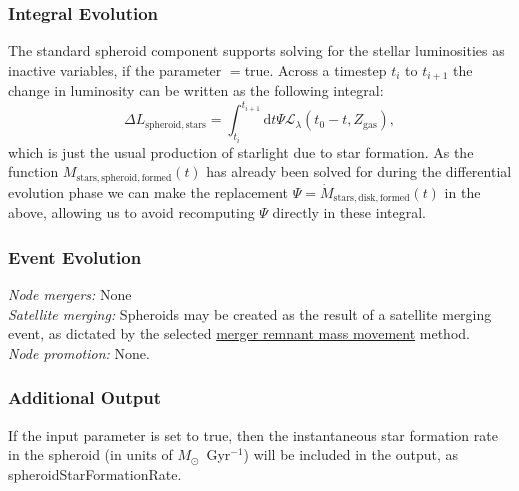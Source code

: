 \subsubsection{Integral Evolution}

The standard spheroid component supports solving for the stellar luminosities as inactive variables, if the parameter {\normalfont \ttfamily [spheroidLuminositiesStellarInactive]}$=${\normalfont \ttfamily true}. Across a timestep $t_i$ to $t_{i+1}$ the change in luminosity can be written as the following integral:
\begin{equation}
\Delta L_\mathrm{spheroid, stars} = \int_{t_{i}}^{t_{i+1}} \mathrm{d}t \Psi \mathcal{L}_\lambda(t_0-t,Z_\mathrm{gas}),
\end{equation}
which is just the usual production of starlight due to star formation. As the function $M_\mathrm{stars, spheroid, formed}(t)$ has already been solved for during the differential evolution phase we can make the replacement $\Psi = \dot{M}_\mathrm{stars, disk, formed}(t)$ in the above, allowing us to avoid recomputing $\Psi$ directly in these integral.

\subsubsection{Event Evolution}

\noindent\emph{Node mergers:} None\\

\noindent\emph{Satellite merging:} Spheroids may be created as the result of a satellite merging event, as dictated by the selected \href{https://github.com/galacticusorg/galacticus/releases/download/masterRelease/Galacticus_Development.pdf\#methods.mergerMassMovements}{merger remnant mass movement} method.\\

\noindent\emph{Node promotion:} None.\\

\subsubsection{Additional Output}

If the {\normalfont \ttfamily [spheroidOutputStarFormationRate]} input parameter is set to true, then the instantaneous star formation rate in the spheroid (in units of $M_\odot$~Gyr$^{-1}$) will be included in the output, as {\normalfont \ttfamily spheroidStarFormationRate}.

